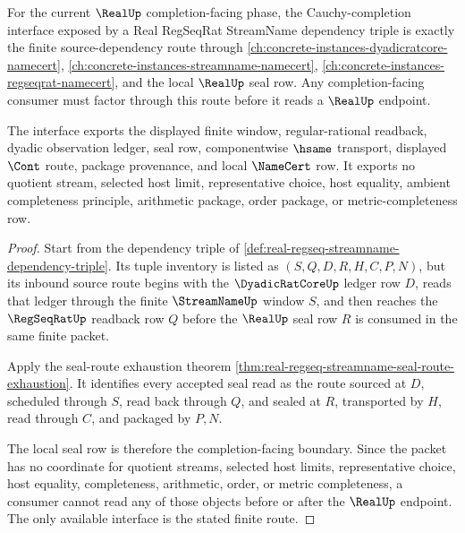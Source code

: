 \begin{theorem}
\label{thm:real-regseq-streamname-cauchy-completion-interface}
For the current $\RealUp$ completion-facing phase, the Cauchy-completion
interface exposed by a Real RegSeqRat StreamName dependency triple is exactly
the finite source-dependency route through
\autoref{ch:concrete-instances-dyadicratcore-namecert},
\autoref{ch:concrete-instances-streamname-namecert},
\autoref{ch:concrete-instances-regseqrat-namecert}, and the local $\RealUp$
seal row. Any completion-facing consumer must factor through this route before
it reads a $\RealUp$ endpoint.

The interface exports the displayed finite window, regular-rational readback,
dyadic observation ledger, seal row, componentwise $\hsame$ transport,
displayed $\Cont$ route, package provenance, and local $\NameCert$ row. It
exports no quotient stream, selected host limit, representative choice,
host equality, ambient completeness principle, arithmetic package, order
package, or metric-completeness row.
\end{theorem}
\begin{proof}
Start from the dependency triple of
\autoref{def:real-regseq-streamname-dependency-triple}. Its tuple inventory is
listed as $(S,Q,D,R,H,C,P,N)$, but its inbound source route begins with the
$\DyadicRatCoreUp$ ledger row $D$, reads that ledger through the finite
$\StreamNameUp$ window $S$, and then reaches the $\RegSeqRatUp$ readback row
$Q$ before the $\RealUp$ seal row $R$ is consumed in the same finite packet.

Apply the seal-route exhaustion theorem
\autoref{thm:real-regseq-streamname-seal-route-exhaustion}. It identifies
every accepted seal read as the route sourced at $D$, scheduled through $S$,
read back through $Q$, and sealed at $R$, transported by $H$, read through
$C$, and packaged by $P,N$.

The local seal row is therefore the completion-facing boundary. Since the
packet has no coordinate for quotient streams, selected host limits,
representative choice, host equality, completeness, arithmetic, order, or
metric completeness, a consumer cannot read any of those objects before or
after the $\RealUp$ endpoint. The only available interface is the stated
finite route.
\end{proof}

